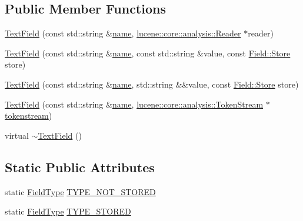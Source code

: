 \subsection*{Public Member Functions}
\begin{DoxyCompactItemize}
\item 
\mbox{\hyperlink{classlucene_1_1core_1_1document_1_1TextField_a2b7a587298cd4f15df081de5ef1c868a}{Text\+Field}} (const std\+::string \&\mbox{\hyperlink{classlucene_1_1core_1_1document_1_1Field_a52f673f3b3abb14b180f5159f4726537}{name}}, \mbox{\hyperlink{classlucene_1_1core_1_1analysis_1_1Reader}{lucene\+::core\+::analysis\+::\+Reader}} $\ast$reader)
\item 
\mbox{\hyperlink{classlucene_1_1core_1_1document_1_1TextField_a240a22520ea651981c9ee78d5e3bc5d8}{Text\+Field}} (const std\+::string \&\mbox{\hyperlink{classlucene_1_1core_1_1document_1_1Field_a52f673f3b3abb14b180f5159f4726537}{name}}, const std\+::string \&value, const \mbox{\hyperlink{classlucene_1_1core_1_1document_1_1Field_a7d5d79f0c56d3548ab8d46d0e7dae35d}{Field\+::\+Store}} store)
\item 
\mbox{\hyperlink{classlucene_1_1core_1_1document_1_1TextField_a7cf6397f05d45eda68c7ff78518e0cac}{Text\+Field}} (const std\+::string \&\mbox{\hyperlink{classlucene_1_1core_1_1document_1_1Field_a52f673f3b3abb14b180f5159f4726537}{name}}, std\+::string \&\&value, const \mbox{\hyperlink{classlucene_1_1core_1_1document_1_1Field_a7d5d79f0c56d3548ab8d46d0e7dae35d}{Field\+::\+Store}} store)
\item 
\mbox{\hyperlink{classlucene_1_1core_1_1document_1_1TextField_a326a52b309ab1d5aa778b48f4c63166d}{Text\+Field}} (const std\+::string \&\mbox{\hyperlink{classlucene_1_1core_1_1document_1_1Field_a52f673f3b3abb14b180f5159f4726537}{name}}, \mbox{\hyperlink{classlucene_1_1core_1_1analysis_1_1TokenStream}{lucene\+::core\+::analysis\+::\+Token\+Stream}} $\ast$\mbox{\hyperlink{classlucene_1_1core_1_1document_1_1Field_a9ae72843cbdd8524362f65ee9f2c7355}{tokenstream}})
\item 
virtual \mbox{\hyperlink{classlucene_1_1core_1_1document_1_1TextField_afff9acea77a706d6b92c1c5dd2f057ce}{$\sim$\+Text\+Field}} ()
\end{DoxyCompactItemize}
\subsection*{Static Public Attributes}
\begin{DoxyCompactItemize}
\item 
static \mbox{\hyperlink{classlucene_1_1core_1_1document_1_1FieldType}{Field\+Type}} \mbox{\hyperlink{classlucene_1_1core_1_1document_1_1TextField_a1e2da64d8301a994afab6f2866fc1240}{T\+Y\+P\+E\+\_\+\+N\+O\+T\+\_\+\+S\+T\+O\+R\+ED}}
\item 
static \mbox{\hyperlink{classlucene_1_1core_1_1document_1_1FieldType}{Field\+Type}} \mbox{\hyperlink{classlucene_1_1core_1_1document_1_1TextField_aeb382d647260b7dce955b98afe8dd0e7}{T\+Y\+P\+E\+\_\+\+S\+T\+O\+R\+ED}}
\end{DoxyCompactItemize}
